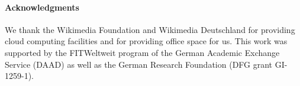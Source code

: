 \documentclass[a4paper]{article}
\begin{document}
\paragraph*{Acknowledgments} We thank the Wikimedia Foundation and Wikimedia Deutschland for providing cloud computing facilities and for providing office space for us.
This work was supported by the FITWeltweit program of the German Academic Exchange Service (DAAD) as well as the German Research Foundation (DFG grant GI-1259-1).
\printbibliography%
\end{document}
